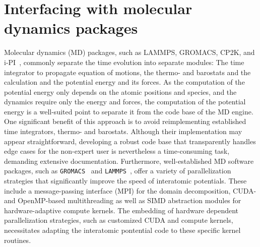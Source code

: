 \section{Interfacing with molecular dynamics packages}
Molecular dynamics (MD) packages, such as LAMMPS, GROMACS, CP2K, and i-PI~\cite{LAMMPS,hess+08jctc,kuhne2020cp2k,kapil2019pi}, commonly separate the time evolution into separate modules: The time integrator to propagate equation of motions, the thermo- and barostats and the calculation and the potential energy and its forces.
As the computation of the potential energy only depends on the atomic positions and species, and the dynamics require only the energy and forces, the computation of the potential energy is a well-suited point to separate it from the code base of the MD engine.
One significant benefit of this approach is to avoid reimplementing established time integrators, thermo- and barostats.
Although their implementation may appear straightforward, developing a robust code base that transparently handles edge cases for the non-expert user is nevertheless a time-consuming task, demanding extensive documentation.
Furthermore, well-established MD software packages, such as \texttt{GROMACS}~\cite{abraham2015gromacs} and \texttt{LAMMPS}~\cite{LAMMPS}, offer a variety of parallelization strategies that significantly improve the speed of interatomic potentials.
These include a message-passing interface (MPI) for the domain decomposition, CUDA- and OpenMP-based multithreading as well as SIMD abstraction modules for hardware-adaptive compute kernels.
The embedding of hardware dependent parallelization strategies, such as customized CUDA and compute kernels, necessitates adapting the interatomic pontential code to these specific kernel routines.
